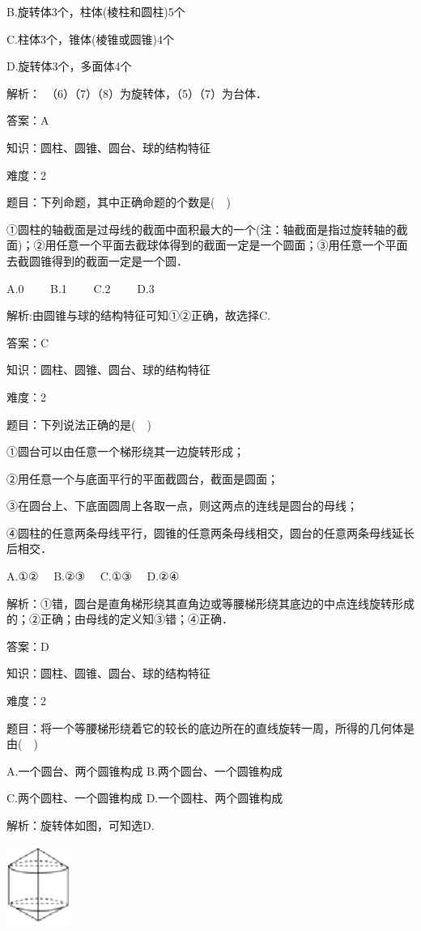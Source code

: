\documentclass{article} %
\begin{document}
B.旋转体3个，柱体(棱柱和圆柱)5个

C.柱体3个，锥体(棱锥或圆锥)4个

D.旋转体3个，多面体4个

解析：　（6）（7）（8）为旋转体，（5）（7）为台体．

答案：A

知识：圆柱、圆锥、圆台、球的结构特征

难度：2

题目：下列命题，其中正确命题的个数是(　)

①圆柱的轴截面是过母线的截面中面积最大的一个(注：轴截面是指过旋转轴的截面)；②用任意一个平面去截球体得到的截面一定是一个圆面；③用任意一个平面去截圆锥得到的截面一定是一个圆．

A.0　　 B.1　　 C.2　　 D.3

解析:由圆锥与球的结构特征可知①②正确，故选择C.

答案：C

知识：圆柱、圆锥、圆台、球的结构特征

难度：2

题目：下列说法正确的是(　)

①圆台可以由任意一个梯形绕其一边旋转形成；

②用任意一个与底面平行的平面截圆台，截面是圆面；

③在圆台上、下底面圆周上各取一点，则这两点的连线是圆台的母线；

④圆柱的任意两条母线平行，圆锥的任意两条母线相交，圆台的任意两条母线延长后相交．

A.①②　 B.②③　 C.①③　 D.②④

解析：①错，圆台是直角梯形绕其直角边或等腰梯形绕其底边的中点连线旋转形成的；②正确；由母线的定义知③错；④正确．

答案：D

知识：圆柱、圆锥、圆台、球的结构特征

难度：2

题目：将一个等腰梯形绕着它的较长的底边所在的直线旋转一周，所得的几何体是由(　)

A.一个圆台、两个圆锥构成 B.两个圆台、一个圆锥构成

C.两个圆柱、一个圆锥构成 D.一个圆柱、两个圆锥构成

解析：旋转体如图，可知选D.

\includegraphics*[width=0.86in, height=1.02in, keepaspectratio=false]{image22}
\end{document}
